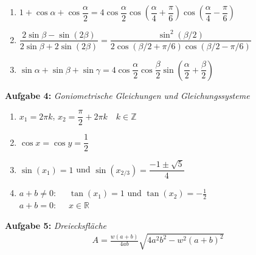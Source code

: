 \begin{enumerate}[label=(\alph*)]
    \item $1+\cos\alpha+\cos\dfrac{\alpha}{2}=4\cos\dfrac{\alpha}{2}\cos\left(\dfrac{\alpha}{4}+\dfrac{\pi}{6}\right)\cos\left(\dfrac{\alpha}{4}-\dfrac{\pi}{6}\right)$
    \item $\dfrac{2\sin\beta-\sin(2\beta)}{2\sin\beta+2\sin(2\beta)}=\dfrac{\sin^2(\beta/2)}{2\cos(\beta/2+\pi/6)\cos(\beta/2-\pi/6)}$
    \item $\sin\alpha+\sin\beta+\sin\gamma=4\cos\dfrac{\alpha}{2}\cos\dfrac{\beta}{2}\sin\left(\dfrac{\alpha}{2}+\dfrac{\beta}{2}\right)$
\end{enumerate}
\vspace{1cm}
%
\textbf{Aufgabe 4: } \emph{Goniometrische Gleichungen und Gleichungssysteme}
\begin{enumerate}[label=(\alph*)]
    \item $x_1=2\pi k$, $x_2=\dfrac{\pi}{2}+2\pi k$\ \ $k\in\mathbb{Z}$
    \item $\cos x=\cos y=\dfrac{1}{2}$
    \item $\sin(x_1)=1$ \hspace{0.3cm}und\hspace{0.3cm} $\sin(x_{2/3})=\dfrac{-1\pm\sqrt{5}}{4}$
    \item $a+b\ne 0$:\ \ \ $\tan (x_1)=1$  \hspace{0.2cm}und\hspace{0.2cm} $\tan(x_2)=-\frac{1}{2}$\\
    $a+b=0$:\ \ \ $x\in\mathbb{R}$
\end{enumerate}
\vspace{1cm}
%
\textbf{Aufgabe 5: } \emph{Dreiecksfläche}
\begin{align*}
A=\frac{w(a+b)}{4ab}\sqrt{4a^2b^2-w^2(a+b)^2}
\end{align*}\\[0.7cm]
%
